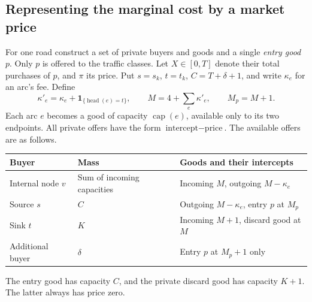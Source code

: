 \documentclass[11pt]{article}
\DeclareMathOperator{\caparc}{cap}
\begin{document}
\subsection{Representing the marginal cost by a market price}

For one road construct a set of private buyers and goods and a single
\emph{entry good} \(p\). Only \(p\) is offered to the traffic classes.
Let \(X\in[0,T]\) denote their total purchases of \(p\), and \(\pi\) its
price. Put \(s=s_k\), \(t=t_k\), \(C=T+\delta+1\), and write
\(\kappa_e\) for an arc's fee. Define
\[
 \kappa'_e=\kappa_e+\mathbf1_{\{\operatorname{head}(e)=t\}},
 \qquad M=4+\sum_e\kappa'_e,\qquad M_p=M+1.
\]
Each arc \(e\) becomes a good of capacity \(\caparc(e)\), available only
to its two endpoints. All private offers have the form
\(\text{intercept}-\text{price}\). The available offers are as follows.

\begin{center}
\small
\begin{tabular}{@{}lll@{}}
\toprule
Buyer & Mass & Goods and their intercepts\\
\midrule
Internal node \(v\) & Sum of incoming capacities &
  Incoming \(M\), outgoing \(M-\kappa_e\)\\
Source \(s\) & \(C\) & Outgoing \(M-\kappa_e\), entry \(p\) at \(M_p\)\\
Sink \(t\) & \(K\) & Incoming \(M+1\), discard good at \(M\)\\
Additional buyer & \(\delta\) & Entry \(p\) at \(M_p+1\) only\\
\bottomrule
\end{tabular}
\end{center}
The entry good has capacity \(C\), and the private discard good has
capacity \(K+1\). The latter always has price zero.
\end{document}
